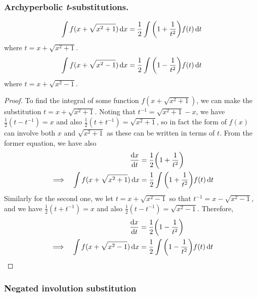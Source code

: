 \subsubsection{Archyperbolic \textit t-substitutions.}

\begin{theorem}
\begin{equation*}
\int f(x + \sqrt{x^2 + 1}) \dd{x}
    = \frac 12 \int \pqty{1 + \frac 1{t^2}}f(t) \dd{t}
\end{equation*}
where \(t = x + \sqrt{x^2 + 1}\).
\begin{equation*}
\int f(x + \sqrt{x^2 - 1}) \dd{x}
    = \frac 12 \int \pqty{1 - \frac 1{t^2}}f(t) \dd{t}
\end{equation*}
where \(t = x + \sqrt{x^2 - 1}\).
\end{theorem}
\begin{proof}
To find the integral of some function \(f(x + \sqrt{x^2 + 1})\), we can make
the substitution \(t = x + \sqrt{x^2 + 1}\). Noting that
\(t^{-1} = \sqrt{x^2 + 1} - x\), we have \(\frac 12(t - t^{-1}) = x\)
and also \(\frac 12(t + t^{-1}) = \sqrt{x^2 + 1}\), so in fact the form of
\(f(x)\) can involve both \(x\) and \(\sqrt{x^2 + 1}\) as these can be
written in terms of \(t\). From the former equation, we have also
\begin{alignat*}{2}
&& \dv{x}{t} &= \frac 12\pqty{1 + \frac 1{t^2}} \\
&\implies& \int f(x + \sqrt{x^2 + 1}) \dd{x}
    &= \frac 12 \int \pqty{1 + \frac 1{t^2}}f(t) \dd{t}
\end{alignat*}
Similarly for the second one, we let \(t = x + \sqrt{x^2 - 1}\) so that
\(t^{-1} = x - \sqrt{x^2 - 1}\), and we have \(\frac 12(t + t^{-1}) = x\)
and also \(\frac 12(t - t^{-1}) = \sqrt{x^2 - 1}\). Therefore,
\begin{alignat*}{2}
&& \dv{x}{t} &= \frac 12\pqty{1 - \frac 1{t^2}} \\
&\implies& \int f(x + \sqrt{x^2 - 1}) \dd{x}
    &= \frac 12 \int \pqty{1 - \frac 1{t^2}}f(t) \dd{t} \qedhere
\end{alignat*}
\end{proof}

\subsubsection{Negated involution substitution}

